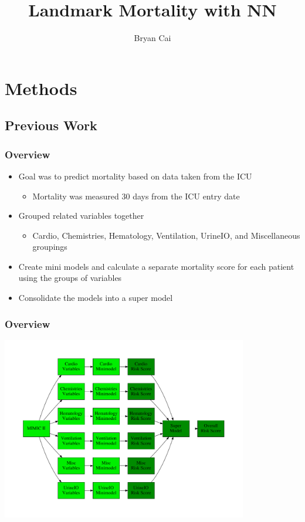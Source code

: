 \documentclass[table]{beamer}
\title{Landmark Mortality with NN}
\author{Bryan Cai}
\institute
{MIT}
\begin{document}
\frame{\titlepage}

\section{Methods}

\subsection{Previous Work}

\begin{frame}
	\frametitle{Overview}
	\begin{itemize}
		\item Goal was to predict mortality based on data taken from the ICU
		\begin{itemize}
			\item Mortality was measured 30 days from the ICU entry date
		\end{itemize}
		\item Grouped related variables together
		\begin{itemize}
			\item Cardio, Chemistries, Hematology, Ventilation, UrineIO, and Miscellaneous groupings
		\end{itemize}
		\item Create mini models and calculate a separate mortality score for each patient using the groups of variables
		\item Consolidate the models into a super model
	\end{itemize}
\end{frame}

\begin{frame}
	\frametitle{Overview}
	\begin{center}
		\includegraphics[height=8cm]{Images/Graphs/Overview.pdf}
	\end{center}
\end{frame}
\end{document}
